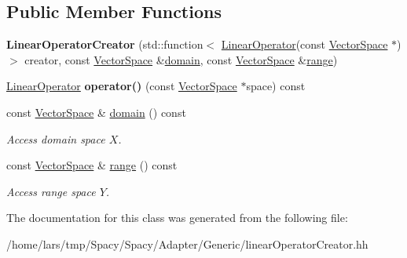 \subsection*{Public Member Functions}
\begin{DoxyCompactItemize}
\item 
{\bfseries Linear\+Operator\+Creator} (std\+::function$<$ \hyperlink{classSpacy_1_1LinearOperator}{Linear\+Operator}(const \hyperlink{classSpacy_1_1VectorSpace}{Vector\+Space} $\ast$)$>$ creator, const \hyperlink{classSpacy_1_1VectorSpace}{Vector\+Space} \&\hyperlink{classSpacy_1_1OperatorBase_a2588f9b3e0188820c4c494e63293dc6f}{domain}, const \hyperlink{classSpacy_1_1VectorSpace}{Vector\+Space} \&\hyperlink{classSpacy_1_1OperatorBase_ab19d3b7a6f290b1079248f1e567e53d6}{range})\hypertarget{classSpacy_1_1Generic_1_1LinearOperatorCreator_a212da2dedb9a6b0e8f45b8625364d832}{}\label{classSpacy_1_1Generic_1_1LinearOperatorCreator_a212da2dedb9a6b0e8f45b8625364d832}

\item 
\hyperlink{classSpacy_1_1LinearOperator}{Linear\+Operator} {\bfseries operator()} (const \hyperlink{classSpacy_1_1VectorSpace}{Vector\+Space} $\ast$space) const \hypertarget{classSpacy_1_1Generic_1_1LinearOperatorCreator_a34e9eee442ba1bffeab9905266500bf6}{}\label{classSpacy_1_1Generic_1_1LinearOperatorCreator_a34e9eee442ba1bffeab9905266500bf6}

\item 
const \hyperlink{classSpacy_1_1VectorSpace}{Vector\+Space} \& \hyperlink{classSpacy_1_1OperatorBase_a2588f9b3e0188820c4c494e63293dc6f}{domain} () const \hypertarget{classSpacy_1_1OperatorBase_a2588f9b3e0188820c4c494e63293dc6f}{}\label{classSpacy_1_1OperatorBase_a2588f9b3e0188820c4c494e63293dc6f}

\begin{DoxyCompactList}\small\item\em Access domain space $X$. \end{DoxyCompactList}\item 
const \hyperlink{classSpacy_1_1VectorSpace}{Vector\+Space} \& \hyperlink{classSpacy_1_1OperatorBase_ab19d3b7a6f290b1079248f1e567e53d6}{range} () const \hypertarget{classSpacy_1_1OperatorBase_ab19d3b7a6f290b1079248f1e567e53d6}{}\label{classSpacy_1_1OperatorBase_ab19d3b7a6f290b1079248f1e567e53d6}

\begin{DoxyCompactList}\small\item\em Access range space $Y$. \end{DoxyCompactList}\end{DoxyCompactItemize}


The documentation for this class was generated from the following file\+:\begin{DoxyCompactItemize}
\item 
/home/lars/tmp/\+Spacy/\+Spacy/\+Adapter/\+Generic/linear\+Operator\+Creator.\+hh\end{DoxyCompactItemize}
